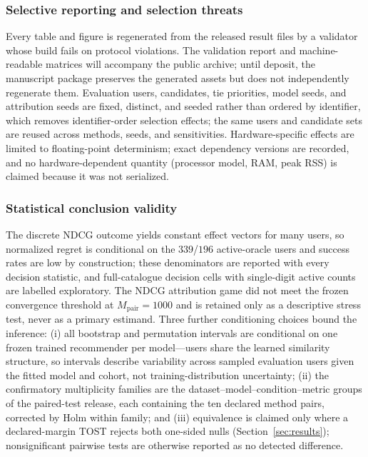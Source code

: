 \documentclass[manuscript,screen,review,anonymous]{acmart}
\begin{document}
\subsubsection{Selective reporting and selection threats}
Every table and figure is regenerated from the released result files by a validator whose build fails on protocol violations. The validation report and machine-readable matrices will accompany the public archive; until deposit, the manuscript package preserves the generated assets but does not independently regenerate them. Evaluation users, candidates, tie priorities, model seeds, and attribution seeds are fixed, distinct, and seeded rather than ordered by identifier, which removes identifier-order selection effects; the same users and candidate sets are reused across methods, seeds, and sensitivities. Hardware-specific effects are limited to floating-point determinism; exact dependency versions are recorded, and no hardware-dependent quantity (processor model, RAM, peak RSS) is claimed because it was not serialized.

\subsubsection{Statistical conclusion validity}
The discrete NDCG outcome yields constant effect vectors for many users, so normalized regret is conditional on the $339$/$196$ active-oracle users and success rates are low by construction; these denominators are reported with every decision statistic, and full-catalogue decision cells with single-digit active counts are labelled exploratory. The NDCG attribution game did not meet the frozen convergence threshold at $M_{\mathrm{pair}}=1000$ and is retained only as a descriptive stress test, never as a primary estimand. Three further conditioning choices bound the inference: (i) all bootstrap and permutation intervals are conditional on one frozen trained recommender per model---users share the learned similarity structure, so intervals describe variability across sampled evaluation users given the fitted model and cohort, not training-distribution uncertainty; (ii) the confirmatory multiplicity families are the dataset--model--condition--metric groups of the paired-test release, each containing the ten declared method pairs, corrected by Holm within family; and (iii) equivalence is claimed only where a declared-margin TOST rejects both one-sided nulls (Section~\ref{sec:results}); nonsignificant pairwise tests are otherwise reported as no detected difference.
\end{document}
